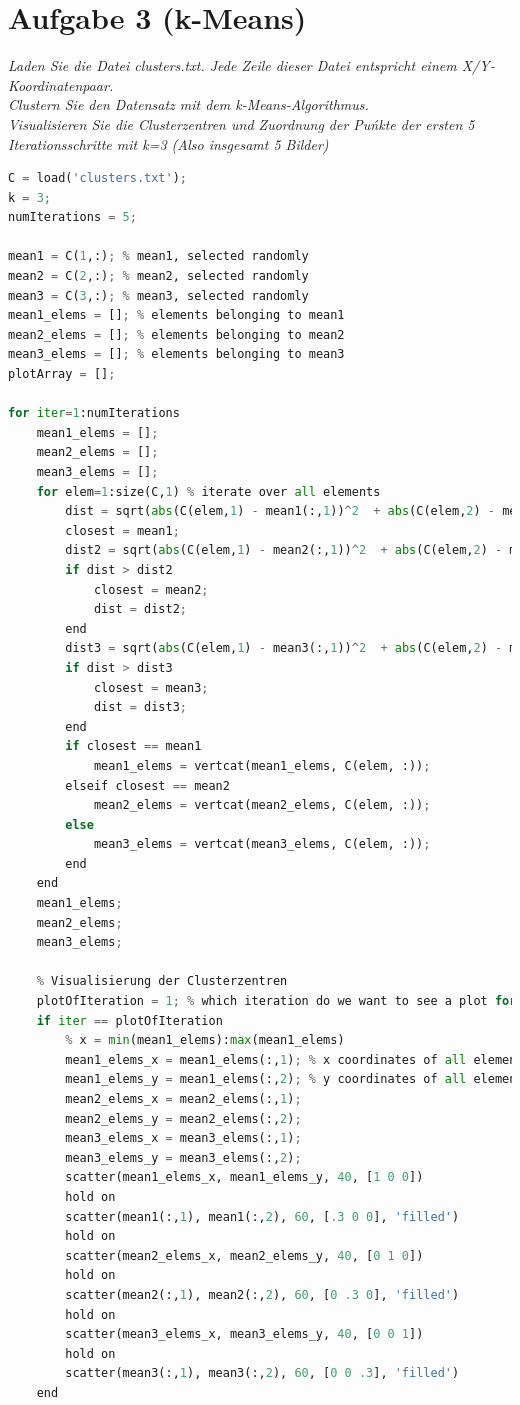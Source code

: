 \documentclass[12pt]{article}
\begin{document}
\section{Aufgabe 3 (k-Means)}
\textit{Laden Sie die Datei clusters.txt​. Jede Zeile dieser Datei entspricht einem X/Y­Koordinatenpaar.\\
Clustern Sie den Datensatz mit dem k­-Means-­Algorithmus.\\
Visualisieren Sie die Clusterzentren und Zuordnung der Puńkte der ersten 5 Iterationsschritte mit k=3 (Also insgesamt 5 Bilder)}
\begin{lstlisting}[language=Python]
C = load('clusters.txt');
k = 3;
numIterations = 5;

mean1 = C(1,:); % mean1, selected randomly
mean2 = C(2,:); % mean2, selected randomly
mean3 = C(3,:); % mean3, selected randomly
mean1_elems = []; % elements belonging to mean1
mean2_elems = []; % elements belonging to mean2
mean3_elems = []; % elements belonging to mean3
plotArray = [];

for iter=1:numIterations
    mean1_elems = [];
    mean2_elems = [];
    mean3_elems = [];
    for elem=1:size(C,1) % iterate over all elements
        dist = sqrt(abs(C(elem,1) - mean1(:,1))^2  + abs(C(elem,2) - mean1(:,2))^2);
        closest = mean1;
        dist2 = sqrt(abs(C(elem,1) - mean2(:,1))^2  + abs(C(elem,2) - mean2(:,2))^2);
        if dist > dist2
            closest = mean2;
            dist = dist2;
        end
        dist3 = sqrt(abs(C(elem,1) - mean3(:,1))^2  + abs(C(elem,2) - mean3(:,2))^2);
        if dist > dist3
            closest = mean3;
            dist = dist3;
        end
        if closest == mean1
            mean1_elems = vertcat(mean1_elems, C(elem, :));
        elseif closest == mean2
            mean2_elems = vertcat(mean2_elems, C(elem, :));
        else
            mean3_elems = vertcat(mean3_elems, C(elem, :));
        end
    end
    mean1_elems;
    mean2_elems;
    mean3_elems;
    
    % Visualisierung der Clusterzentren
    plotOfIteration = 1; % which iteration do we want to see a plot for?
    if iter == plotOfIteration
        % x = min(mean1_elems):max(mean1_elems)
        mean1_elems_x = mean1_elems(:,1); % x coordinates of all elements belonging to mean1
        mean1_elems_y = mean1_elems(:,2); % y coordinates of all elements belonging to mean1
        mean2_elems_x = mean2_elems(:,1);
        mean2_elems_y = mean2_elems(:,2);
        mean3_elems_x = mean3_elems(:,1);
        mean3_elems_y = mean3_elems(:,2);
        scatter(mean1_elems_x, mean1_elems_y, 40, [1 0 0])
        hold on
        scatter(mean1(:,1), mean1(:,2), 60, [.3 0 0], 'filled')
        hold on
        scatter(mean2_elems_x, mean2_elems_y, 40, [0 1 0])
        hold on
        scatter(mean2(:,1), mean2(:,2), 60, [0 .3 0], 'filled')
        hold on
        scatter(mean3_elems_x, mean3_elems_y, 40, [0 0 1])
        hold on
        scatter(mean3(:,1), mean3(:,2), 60, [0 0 .3], 'filled')
    end
    

\end{lstlisting}
\end{document}
